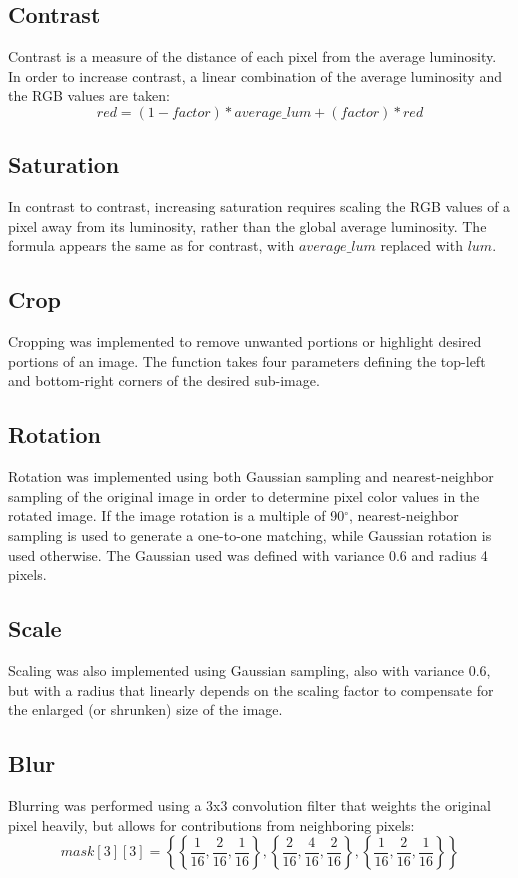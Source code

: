 \documentclass[10pt,twocolumn,twoside]{IEEEtran}
\begin{document}
\subsection{Contrast}
Contrast is a measure of the distance of each pixel from the average luminosity. In order to increase contrast,  a linear combination of the average luminosity and the RGB values are taken:
\begin{equation*} red = (1 - factor)*average\_lum + (factor)*red \end{equation*}

\subsection{Saturation}
In contrast to contrast, increasing saturation requires scaling the RGB values of a pixel away from its luminosity, rather than the global average luminosity. The formula appears the same as for contrast, with $average\_lum$ replaced with $lum$.

\subsection{Crop}
Cropping was implemented to remove unwanted portions or highlight desired portions of an image. The function takes four parameters defining the top-left and bottom-right corners of the desired sub-image.

\subsection{Rotation}
Rotation was implemented using both Gaussian sampling and nearest-neighbor sampling of the original image in order to determine pixel color values in the rotated image. If the image rotation is a multiple of 90$^\circ$, nearest-neighbor sampling is used to generate a one-to-one matching, while Gaussian rotation is used otherwise. The Gaussian used was defined with variance 0.6 and radius 4 pixels. 

\subsection{Scale}
Scaling was also implemented using Gaussian sampling, also with variance 0.6, but with a radius that linearly depends on the scaling factor to compensate for the enlarged (or shrunken) size of the image.

\subsection{Blur}
Blurring was performed using a 3x3 convolution filter that weights the original pixel heavily, but allows for contributions from neighboring pixels:
\begin{equation*}
mask[3][3] = \left\{ \left\{\frac{1}{16}, \frac{2}{16}, \frac{1}{16}\right\}, \left\{\frac{2}{16}, \frac{4}{16}, \frac{2}{16}\right\}, \left\{\frac{1}{16}, \frac{2}{16}, \frac{1}{16}\right\} \right\}
\end{equation*}
\end{document}
